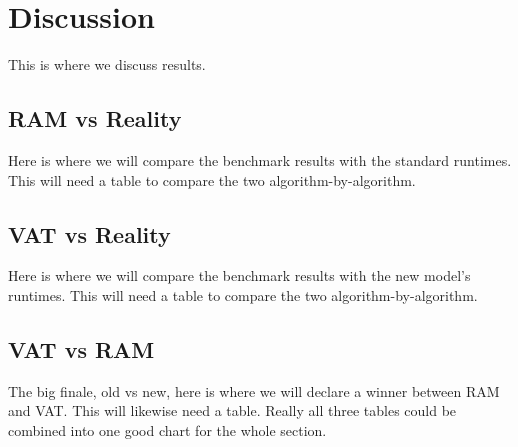 \section{Discussion}

This is where we discuss results.

  \subsection{RAM vs Reality}
    Here is where we will compare the benchmark results with the standard runtimes.
    This will need a table to compare the two algorithm-by-algorithm.

  \subsection{VAT vs Reality}
    Here is where we will compare the benchmark results with the new model's runtimes.
    This will need a table to compare the two algorithm-by-algorithm.

  \subsection{VAT vs RAM}
    The big finale, old vs new, here is where we will declare a winner between RAM
    and VAT.
    This will likewise need a table.
    Really all three tables could be combined into one good chart for the whole section.
